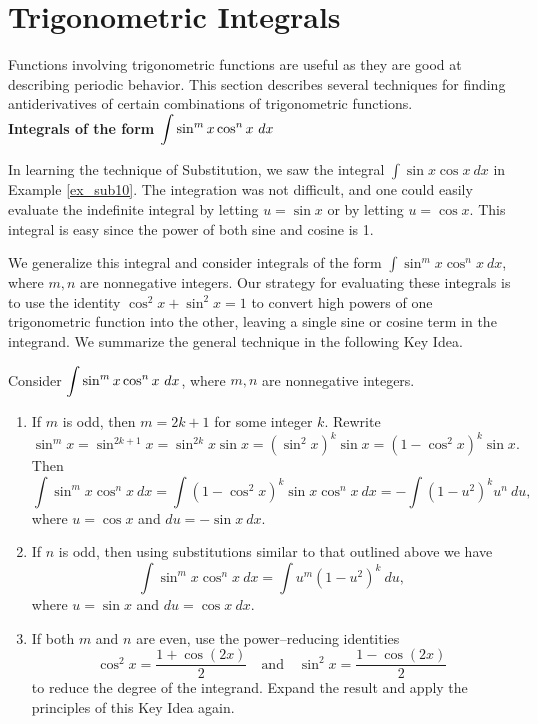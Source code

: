 \pagebreak
\section{Trigonometric Integrals}\label{sec:trigint}
Functions involving trigonometric functions are useful as they are good at describing periodic behavior. %
 This section describes several techniques for finding antiderivatives of certain combinations of trigonometric functions.\\

\noindent\textbf{\large Integrals of the form $\ds \int \sin^m x\cos^n x\ dx$}

In learning the technique of Substitution, we saw the integral $\int \sin x\cos x\ dx$ in Example \ref{ex_sub10}. The integration was not difficult, and one could easily evaluate the indefinite integral by letting $u=\sin x$ or by letting $u = \cos x$. This integral is easy since the power of both sine and cosine is 1.

We generalize this integral and consider integrals of the form $\int \sin^mx\cos^nx\ dx$, where $m,n$ are nonnegative integers. Our strategy for evaluating these integrals is to use the identity $\cos^2x+\sin^2x=1$ to convert high powers of one trigonometric function into the other, leaving a single sine or cosine term in the integrand. We summarize the general technique in the following Key Idea.

\enlargethispage{2\baselineskip}
\setboxwidth{60pt}
\noindent\ifthenelse{\isodd{\thepage}}{}{\hskip -60pt}
\begin{minipage}{\specialboxlength}
{Consider $\ds \int \sin^mx\cos^nx\ dx$, where $m,n$ are nonnegative integers.
	\begin{enumerate}
	\item		If $m$ is odd, then $m=2k+1$ for some integer $k$. Rewrite \small
			$$ \sin^mx = \sin^{2k+1}x = \sin^{2k}x\sin x = (\sin^2x)^k\sin x = (1-\cos^2x)^k\sin x.$$\normalsize
			Then \small
			$$\int \sin^mx\cos^nx\ dx = \int (1-\cos^2x)^k\sin x\cos^nx\ dx = -\int (1-u^2)^ku^n\ du,$$\normalsize
			where $u = \cos x$ and $du = -\sin x\ dx$. 
	\item		If $n$ is odd, then using substitutions similar to that outlined above we have
			\small
			$$ \int \sin^mx\cos^nx\ dx = \int u^m(1-u^2)^k\ du,$$ \normalsize
			where $u = \sin x$ and $du = \cos x\ dx$.
	\item		If both $m$ and $n$ are even, use the power--reducing identities
		\small$$  \cos^2x = \frac{1+\cos (2x)}{2} \quad \text{and}\quad \sin^2x = \frac{1-\cos(2x)}2$$\normalsize
	to reduce the degree of the integrand. Expand the result and apply the principles of this Key Idea again.
	\end{enumerate}
}
\end{minipage}
\restoreboxwidth

